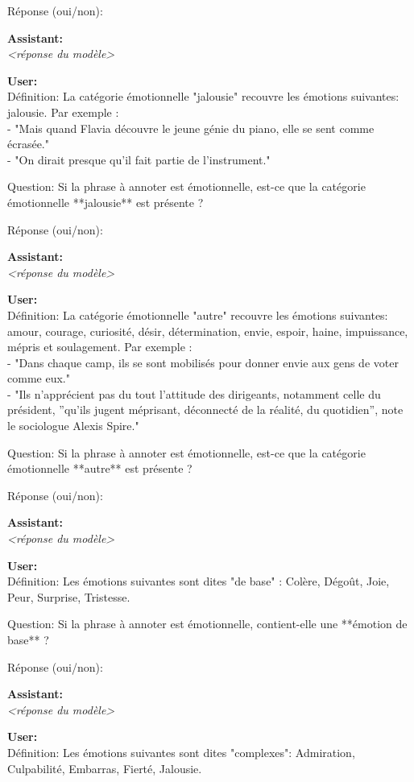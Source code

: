 {Réponse (oui/non):

\textbf{Assistant:}\\
\textit{<réponse du modèle>}

\textbf{User:}\\
Définition: La catégorie émotionnelle "jalousie" recouvre les émotions suivantes: jalousie. Par exemple :\\
- "Mais quand Flavia découvre le jeune génie du piano, elle se sent comme écrasée."\\
- "On dirait presque qu'il fait partie de l'instrument."

Question: Si la phrase à annoter est émotionnelle, est-ce que la catégorie émotionnelle **jalousie** est présente ?

Réponse (oui/non):

\textbf{Assistant:}\\
\textit{<réponse du modèle>}

\textbf{User:}\\
Définition: La catégorie émotionnelle "autre" recouvre les émotions suivantes: amour, courage, curiosité, désir, détermination, envie, espoir, haine, impuissance, mépris et soulagement. Par exemple :\\
- "Dans chaque camp, ils se sont mobilisés pour donner envie aux gens de voter comme eux."\\
- "Ils n'apprécient pas du tout l'attitude des dirigeants, notamment celle du président, ''qu'ils jugent méprisant, déconnecté de la réalité, du quotidien'', note le sociologue Alexis Spire."

Question: Si la phrase à annoter est émotionnelle, est-ce que la catégorie émotionnelle **autre** est présente ?

Réponse (oui/non):

\textbf{Assistant:}\\
\textit{<réponse du modèle>}

\textbf{User:}\\
Définition: Les émotions suivantes sont dites "de base" : Colère, Dégoût, Joie, Peur, Surprise, Tristesse.

Question: Si la phrase à annoter est émotionnelle, contient-elle une **émotion de base** ?

Réponse (oui/non):

\textbf{Assistant:}\\
\textit{<réponse du modèle>}

\textbf{User:}\\
Définition: Les émotions suivantes sont dites "complexes": Admiration, Culpabilité, Embarras, Fierté, Jalousie.

}
